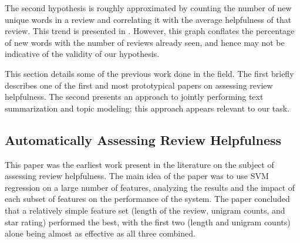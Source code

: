 \documentclass[letter,12pt]{article}
\begin{document}

The second hypothesis is roughly approximated by counting the number of
	new unique words in a review and correlating it with the average helpfulness
	of that review.
This trend is presented in .
However, this graph conflates the percentage of new words with the number of
	reviews already seen, and hence may not be indicative of the validity
	of our hypothesis.




This section details some of the previous work done in the field.
The first briefly describes one of the first and most prototypical papers
	on assessing review helpfulness.
The second presents an approach to jointly performing text summarization
	and topic modeling; this approach appears relevant to our task.

\subsection{Automatically Assessing Review Helpfulness \cite{2006kim-helpfulness}}
This paper was the earliest work present in the literature on the subject of assessing review helpfulness.
The main idea of the paper was to use SVM regression on a large number of features,
	analyzing the results and the impact of each subset of features on the performance
	of the system.
The paper concluded that a relatively simple feature set (length of the review,
	unigram counts, and star rating) performed the best, with the first two
	(length and unigram counts) alone being almost as effective as all three
	combined.
\end{document}
